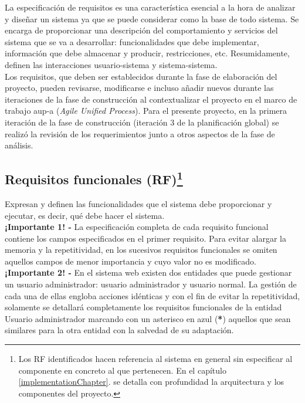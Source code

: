 \documentclass[12pt,a4paper, twoside]{report}
\begin{document}
	La especificación de requisitos es una característica esencial a la hora de analizar y diseñar un sistema ya que se puede considerar como la base de todo sistema. Se encarga de proporcionar una descripción del comportamiento y servicios del sistema que se va a desarrollar: funcionalidades que debe implementar, información que debe almacenar y producir, restricciones, etc. Resumidamente, definen las interacciones usuario-sistema y sistema-sistema.\\
	
	Los requisitos, que deben ser establecidos durante la fase de elaboración del proyecto, pueden revisarse, modificarse e incluso añadir nuevos durante las iteraciones de la fase de construcción al contextualizar el proyecto en el marco de trabajo \gls{aup-a} (\textit{Agile Unified Process}). Para el presente proyecto, en la primera iteración de la fase de construcción (iteración 3 de la planificación global) se realizó la revisión de los requerimientos junto a otros aspectos de la fase de análisis.

	\subsection[Requisitos funcionales (RF)]{Requisitos funcionales (RF)\footnote{Los RF identificados hacen referencia al sistema en general sin especificar al componente en concreto al que pertenecen. En el capítulo \ref{implementationChapter}.  se detalla con profundidad la arquitectura y los componentes del proyecto.}}
	
	Expresan y definen las funcionalidades que el sistema debe proporcionar y ejecutar, es decir, qué debe hacer el sistema. \\
	
	\textbf{¡Importante 1! -} La especificación completa de cada requisito funcional contiene los campos especificados en el primer requisito. Para evitar alargar la memoria y la repetitividad, en los sucesivos requisitos funcionales se omiten aquellos campos de menor importancia y cuyo valor no es modificado. \\

	\textbf{¡Importante 2! -} En el sistema web existen dos entidades que puede gestionar un usuario administrador: usuario administrador y usuario normal. La gestión de cada una de ellas engloba acciones idénticas y con el fin de evitar la repetitividad, solamente se detallará completamente los requisitos funcionales de la entidad Usuario administrador marcando con un asterisco en azul (\textbf{{\color{black!40!blue}*}}) aquellos que sean similares para la otra entidad con la salvedad de su adaptación. \\
	
\end{document}
